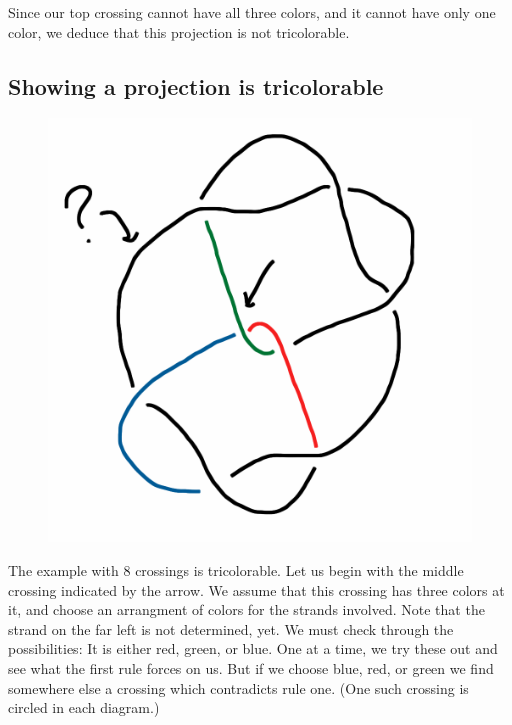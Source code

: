 \documentclass[12pt,letterpaper]{article}
\theoremstyle{definition}
\begin{document}
Since our top crossing cannot have all three colors, and it cannot have only one color, we deduce that this projection is not tricolorable.

\subsection*{Showing a projection is tricolorable}

\begin{figure}
    \centering
    \includegraphics[width=.3\textwidth]{knotpics/colorable1.png}
\end{figure}
The example with 8 crossings is tricolorable.
Let us begin with the middle crossing indicated by the arrow.
We assume that this crossing has three colors at it, and choose an arrangment of colors for the strands involved.
Note that the strand on the far left is not determined, yet.
We must check through the possibilities: It is either red, green, or blue. 
One at a time, we try these out and see what the first rule forces on us.
But if we choose blue, red, or green we find somewhere else a crossing which contradicts rule one.
(One such crossing is circled in each diagram.)
\end{document}
